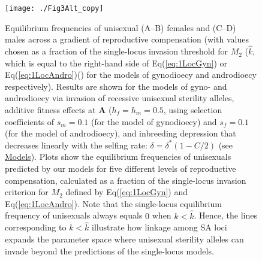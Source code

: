 \documentclass{article}
\begin{document}
\begin{figure}[htbp]
\centering
\texttt{[image: ./Fig3Alt\_copy]}
\caption{Equilibrium frequencies of unisexual (A--B) females and (C--D) males across a gradient of reproductive compensation (with values chosen as a fraction of the single-locus invasion threshold for $M_2$ ($\hat{k}$, which is equal to the right-hand side of Eq(\ref{eq:1LocGyn}) or Eq(\ref{eq:1LocAndro})() for the models of gynodioecy and androdioecy respectively). Results are shown for the models of gyno- and androdioecy via invasion of recessive unisexual sterility alleles, additive fitness effects at $\mathbf{A}$ ($h_f = h_m = 0.5$, using selection coefficients of $s_m = 0.1$ (for the model of gynodioecy) and $s_f = 0.1$ (for the model of androdioecy), and inbreeding depression that decreases linearly with the selfing rate: $\delta = \delta^\ast(1 - C/2)$ (see \hyperref[sec:Models]{Models}). Plots show the equilibrium frequencies of unisexuals predicted by our models for five different levels of reproductive compensation, calculated as a fraction of the single-locus invasion criterion for $M_2$ defined by Eq(\ref{eq:1LocGyn}) and Eq(\ref{eq:1LocAndro}). Note that the single-locus equilibrium frequency of unisexuals always equals $0$ when $k < \hat{k}$. Hence, the lines corresponding to $k < \hat{k}$ illustrate how linkage among SA loci expands the parameter space where unisexual sterility alleles can invade beyond the predictions of the single-locus models.}
\label{fig:eqFreq}
\end{figure}
\end{document}
